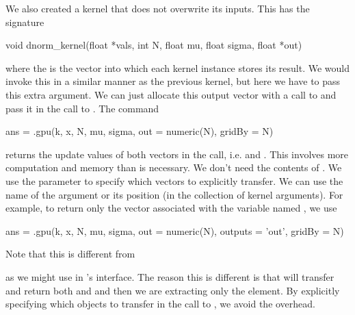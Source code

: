 We also created a kernel that does not overwrite its inputs.
This has the signature
\begin{CCode}
void dnorm_kernel(float *vals, int N, float mu, float sigma, float *out)
\end{CCode}
where the  is the vector into which each kernel instance
stores its result.
We would invoke this in a similar manner as the previous kernel,
but here we have to pass this extra argument.
We can just allocate this output vector with a call to  
and pass it in the call to .
The command
\begin{RCode}
ans = .gpu(k, x, N, mu, sigma, out = numeric(N), gridBy = N)
\end{RCode}
returns the update values of both vectors in the call,
i.e.  and .
This involves more computation and memory
than is necessary.  We don't need the contents of
.
We use the  parameter to specify which 
vectors to explicitly transfer. We can use the
name of the argument or its position (in the collection of kernel
arguments). For example, to return only the vector associated
with the variable named , we use
\begin{RCode}
ans = .gpu(k, x, N, mu, sigma, out = numeric(N),
            outputs = 'out', gridBy = N)
\end{RCode}
Note that this is different  from
as we might use in \R's  interface.
The reason this is different is that  will
transfer and return both  and  and then 
we are extracting only the  element.
By explicitly specifying which objects to transfer in
the call to , we avoid the overhead.



